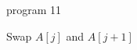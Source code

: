program 11 \documentclass{article}
\begin{document}
	
	\begin{algorithm}
		\caption{Bubble Sort}
		\begin{algorithmic}[1]
			\State Swap $A[j]$ and $A[j+1]$
			\EndIf
			\EndFor
			\EndFor
			\EndProcedure
		\end{algorithmic}
	\end{algorithm}
	
\end{document}
